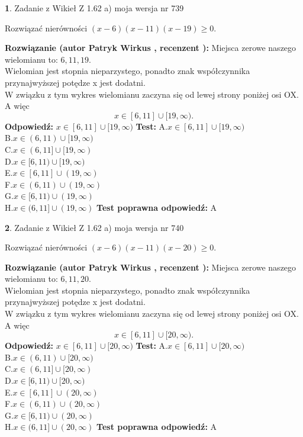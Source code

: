 \documentclass[12pt, a4paper]{article}
\theoremstyle{definition} %
\newtheorem{zad}{}
\newcommand{\zadStart}[1]{\begin{zad}#1\newline}
\newcommand{\zadStop}{\end{zad}}
\newcommand{\rozwStart}[2]{\noindent \textbf{Rozwiązanie (autor #1 , recenzent #2): }\newline}
\newcommand{\rozwStop}{\newline}
\newcommand{\odpStart}{\noindent \textbf{Odpowiedź:}\newline}
\newcommand{\odpStop}{\newline}
\newcommand{\testStart}{\noindent \textbf{Test:}\newline}
\newcommand{\testStop}{\newline}
\newcommand{\kluczStart}{\noindent \textbf{Test poprawna odpowiedź:}\newline}
\newcommand{\kluczStop}{\newline}
\begin{document}
\zadStart{Zadanie z Wikieł Z 1.62 a) moja wersja nr 739}

Rozwiązać nierówności $(x-6)(x-11)(x-19)\ge0$.
\zadStop
\rozwStart{Patryk Wirkus}{}
Miejsca zerowe naszego wielomianu to: $6, 11, 19$.\\
Wielomian jest stopnia nieparzystego, ponadto znak współczynnika przy\linebreak najwyższej potędze x jest dodatni.\\ W związku z tym wykres wielomianu zaczyna się od lewej strony poniżej osi OX. A więc $$x \in [6,11] \cup [19,\infty).$$
\rozwStop
\odpStart
$x \in [6,11] \cup [19,\infty)$
\odpStop
\testStart
A.$x \in [6,11] \cup [19,\infty)$\\
B.$x \in (6,11) \cup [19,\infty)$\\
C.$x \in (6,11] \cup [19,\infty)$\\
D.$x \in [6,11) \cup [19,\infty)$\\
E.$x \in [6,11] \cup (19,\infty)$\\
F.$x \in (6,11) \cup (19,\infty)$\\
G.$x \in [6,11) \cup (19,\infty)$\\
H.$x \in (6,11] \cup (19,\infty)$
\testStop
\kluczStart
A
\kluczStop



\zadStart{Zadanie z Wikieł Z 1.62 a) moja wersja nr 740}

Rozwiązać nierówności $(x-6)(x-11)(x-20)\ge0$.
\zadStop
\rozwStart{Patryk Wirkus}{}
Miejsca zerowe naszego wielomianu to: $6, 11, 20$.\\
Wielomian jest stopnia nieparzystego, ponadto znak współczynnika przy\linebreak najwyższej potędze x jest dodatni.\\ W związku z tym wykres wielomianu zaczyna się od lewej strony poniżej osi OX. A więc $$x \in [6,11] \cup [20,\infty).$$
\rozwStop
\odpStart
$x \in [6,11] \cup [20,\infty)$
\odpStop
\testStart
A.$x \in [6,11] \cup [20,\infty)$\\
B.$x \in (6,11) \cup [20,\infty)$\\
C.$x \in (6,11] \cup [20,\infty)$\\
D.$x \in [6,11) \cup [20,\infty)$\\
E.$x \in [6,11] \cup (20,\infty)$\\
F.$x \in (6,11) \cup (20,\infty)$\\
G.$x \in [6,11) \cup (20,\infty)$\\
H.$x \in (6,11] \cup (20,\infty)$
\testStop
\kluczStart
A
\kluczStop
\end{document}
